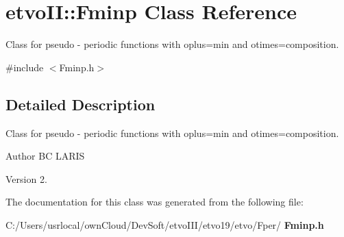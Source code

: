 \section{etvo\+II\+:\+:Fminp Class Reference}
\label{classetvo_i_i_1_1_fminp}


Class for pseudo -\/ periodic functions with oplus=min and otimes=composition.  




{\ttfamily \#include $<$Fminp.\+h$>$}



\subsection{Detailed Description}
Class for pseudo -\/ periodic functions with oplus=min and otimes=composition. 

\begin{DoxyAuthor}{Author}
BC L\+A\+R\+IS 
\end{DoxyAuthor}
\begin{DoxyVersion}{Version}
2. 
\end{DoxyVersion}


The documentation for this class was generated from the following file\+:\begin{DoxyCompactItemize}
\item 
C\+:/\+Users/usrlocal/own\+Cloud/\+Dev\+Soft/etvo\+I\+I\+I/etvo19/etvo/\+Fper/\textbf{ Fminp.\+h}\end{DoxyCompactItemize}
